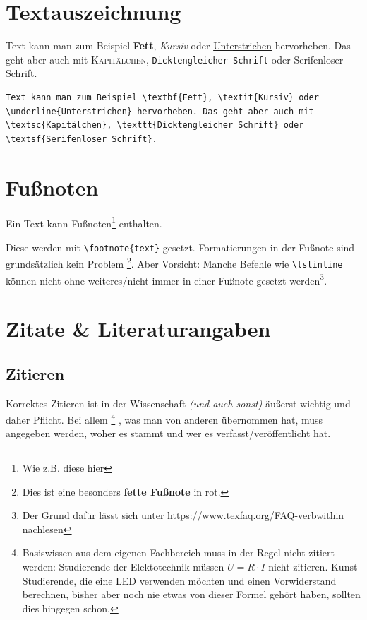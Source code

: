 	\section{Textauszeichnung}
		\begin{vorlagenbeispiel}
			Text kann man zum Beispiel \textbf{Fett}, \textit{Kursiv} oder \underline{Unterstrichen} hervorheben. Das geht aber auch mit \textsc{Kapitälchen}, \texttt{Dicktengleicher Schrift} oder \textsf{Serifenloser Schrift}.
		\end{vorlagenbeispiel}
		\begin{lstlisting}[keywords={textbf, textit, underline, textsc, texttt, textsf}]
Text kann man zum Beispiel \textbf{Fett}, \textit{Kursiv} oder \underline{Unterstrichen} hervorheben. Das geht aber auch mit \textsc{Kapitälchen}, \texttt{Dicktengleicher Schrift} oder \textsf{Serifenloser Schrift}.
		\end{lstlisting}
					
	\section{Fußnoten}
		\begin{vorlagenbeispiel}
		Ein Text kann Fußnoten\footnote{Wie z.B. diese hier} enthalten.
		\end{vorlagenbeispiel}
		Diese werden mit \lstinline|\footnote{text}| gesetzt. Formatierungen in der Fußnote sind grundsätzlich kein Problem%
		\footnote{%
			\color{red}Dies ist eine besonders \textbf{fette Fußnote} in rot.
		}.
%		
		Aber Vorsicht: Manche Befehle wie \zb \lstinline|\lstinline| können nicht ohne weiteres/nicht immer in einer Fußnote gesetzt werden\footnote{Der Grund dafür lässt sich unter \url{https://www.texfaq.org/FAQ-verbwithin} nachlesen}.
	
	\section{Zitate \& Literaturangaben}
		\subsection{Zitieren}
			Korrektes Zitieren ist in der Wissenschaft \emph{(und auch sonst)} äußerst wichtig und daher Pflicht.
%			
			Bei allem%
				\footnote{Basiswissen aus dem eigenen Fachbereich muss in der Regel nicht zitiert werden:
					Studierende der Elektotechnik müssen $U = R \cdot I$ nicht zitieren.
					Kunst-Studierende, die eine LED verwenden möchten und einen Vorwiderstand berechnen, bisher aber noch nie etwas von dieser Formel gehört haben, sollten dies hingegen schon.}%
			, was man von anderen übernommen hat, muss angegeben werden, woher es stammt und wer es verfasst/veröffentlicht hat.
				\medskip
					
